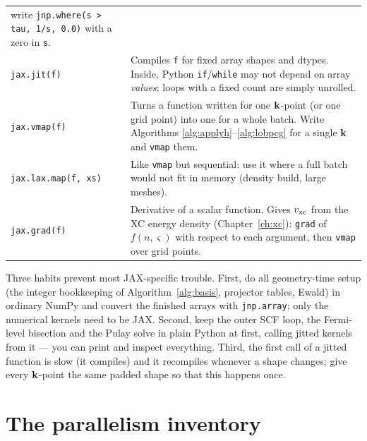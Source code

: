 {\begin{longtable}{@{}>{\raggedright\arraybackslash}p{}p{}@{}}
write \texttt{jnp.where(s > tau, 1/s, 0.0)} with a zero in \texttt{s}.\\
\texttt{jax.jit(f)} & Compiles \texttt{f} for fixed array shapes and
dtypes. Inside, Python \texttt{if}/\texttt{while} may not depend on array
\emph{values}; loops with a fixed count are simply unrolled.\\
\texttt{jax.vmap(f)} & Turns a function written for one $\mathbf{k}$-point (or
one grid point) into one for a whole batch. Write Algorithms
\ref{alg:applyh}--\ref{alg:lobpcg} for a single $\mathbf{k}$ and
\texttt{vmap} them.\\
\texttt{jax.lax.map(f, xs)} & Like \texttt{vmap} but sequential: use it
where a full batch would not fit in memory (density build, large
meshes).\\
\texttt{jax.grad(f)} & Derivative of a scalar function. Gives $v_{\mathrm{xc}}$
from the XC energy density (Chapter~\ref{ch:xc}): \texttt{grad} of
$f(n,\varsigma)$ with respect to each argument, then \texttt{vmap} over
grid points.\\
\end{longtable}}
\noindent Three habits prevent most JAX-specific trouble. First, do all
geometry-time setup (the integer bookkeeping of Algorithm~\ref{alg:basis},
projector tables, Ewald) in ordinary NumPy and convert the finished arrays
with \texttt{jnp.array}; only the numerical kernels need to be JAX.
Second, keep the outer SCF loop, the Fermi-level bisection and the Pulay
solve in plain Python at first, calling jitted kernels from it --- you can
print and inspect everything. Third, the first call of a jitted function
is slow (it compiles) and it recompiles whenever a shape changes; give
every $\mathbf{k}$-point the same padded shape so that this happens once.

\section{The parallelism inventory}


